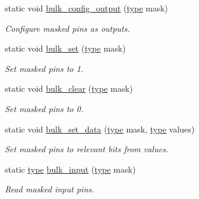 \begin{DoxyCompactItemize}
static void \hyperlink{structavrpp_1_1ports_1_1bulk__port__operations_af2b2a292138a043c21cddfe30bca858f}{bulk\_\-config\_\-output} (\hyperlink{structavrpp_1_1ports_1_1bulk__port__operations_a2a673fecf314e62c4c7a88fc63911ebb}{type} mask)
\begin{DoxyCompactList}\small\item\em Configure masked pins as outputs. \item\end{DoxyCompactList}\item 
static void \hyperlink{structavrpp_1_1ports_1_1bulk__port__operations_a5bc60e9ce2e5f4e82745a4df9f333486}{bulk\_\-set} (\hyperlink{structavrpp_1_1ports_1_1bulk__port__operations_a2a673fecf314e62c4c7a88fc63911ebb}{type} mask)
\begin{DoxyCompactList}\small\item\em Set masked pins to 1. \item\end{DoxyCompactList}\item 
static void \hyperlink{structavrpp_1_1ports_1_1bulk__port__operations_a6409f17a86a6e25f16a0451bf95c89cb}{bulk\_\-clear} (\hyperlink{structavrpp_1_1ports_1_1bulk__port__operations_a2a673fecf314e62c4c7a88fc63911ebb}{type} mask)
\begin{DoxyCompactList}\small\item\em Set masked pins to 0. \item\end{DoxyCompactList}\item 
static void \hyperlink{structavrpp_1_1ports_1_1bulk__port__operations_ab643f33d091d0d70e88cee0c54054158}{bulk\_\-set\_\-data} (\hyperlink{structavrpp_1_1ports_1_1bulk__port__operations_a2a673fecf314e62c4c7a88fc63911ebb}{type} mask, \hyperlink{structavrpp_1_1ports_1_1bulk__port__operations_a2a673fecf314e62c4c7a88fc63911ebb}{type} values)
\begin{DoxyCompactList}\small\item\em Set masked pins to relevant bits from values. \item\end{DoxyCompactList}\item 
static \hyperlink{structavrpp_1_1ports_1_1bulk__port__operations_a2a673fecf314e62c4c7a88fc63911ebb}{type} \hyperlink{structavrpp_1_1ports_1_1bulk__port__operations_ab86ebbb3a59980b4ec760d8a00ea2252}{bulk\_\-input} (\hyperlink{structavrpp_1_1ports_1_1bulk__port__operations_a2a673fecf314e62c4c7a88fc63911ebb}{type} mask)
\begin{DoxyCompactList}\small\item\em Read masked input pins. \item\end{DoxyCompactList}\item 

\end{DoxyCompactItemize}
